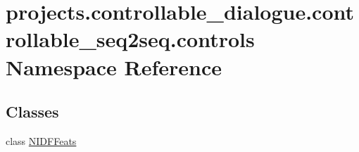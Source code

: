 \hypertarget{namespaceprojects_1_1controllable__dialogue_1_1controllable__seq2seq_1_1controls}{}\section{projects.\+controllable\+\_\+dialogue.\+controllable\+\_\+seq2seq.\+controls Namespace Reference}
\label{namespaceprojects_1_1controllable__dialogue_1_1controllable__seq2seq_1_1controls}
\subsection*{Classes}
\begin{DoxyCompactItemize}
\item 
class \hyperlink{classprojects_1_1controllable__dialogue_1_1controllable__seq2seq_1_1controls_1_1NIDFFeats}{N\+I\+D\+F\+Feats}
\end{DoxyCompactItemize}
